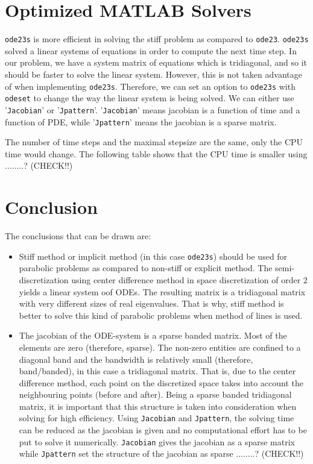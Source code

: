 \documentclass{article}
\begin{document}
\section{Optimized MATLAB Solvers}

\texttt{ode23s} is more efficient in solving the stiff problem as compared to \texttt{ode23}. \texttt{ode23s} solved a linear systems of equations in order to compute the next time step. In our problem, we have a system matrix of equations which is tridiagonal, and so it should be faster to solve the linear system. However, this is not taken advantage of when implementing \texttt{ode23s}. Therefore, we can set an option to \texttt{ode23s} with \texttt{odeset} to change the way the linear system is being solved. We can either use '\texttt{Jacobian}' or '\texttt{Jpattern}'. '\texttt{Jacobian}' means jacobian is a function of time and a function of PDE, while '\texttt{Jpattern}' means the jacobian is a sparse matrix.

The number of time steps and the maximal stepsize are the same, only the CPU time would change. The following table shows that the CPU time is smaller using ........? (CHECK!!)

\section{Conclusion}

The conclusions that can be drawn are:
\begin{itemize}
    \item Stiff method or implicit method (in this case \texttt{ode23s}) should be used for parabolic problems as compared to non-stiff or explicit method. The semi-discretization using center difference method in space discretization of order 2 yields a linear system oof ODEs. The resulting matrix is a tridiagonal matrix with very different sizes of real eigenvalues. That is why, stiff method is better to solve this kind of parabolic problems when method of lines is used.
    \item The jacobian of the ODE-system is a sparse banded matrix. Most of the elements are zero (therefore, sparse). The non-zero entities are confined to a diagonal band and the bandwidth is relatively small (therefore, band/banded), in this case a tridiagonal matrix. That is, due to the center difference method, each point on the discretized space takes into account the neighbouring points (before and after). Being a sparse banded tridiagonal matrix, it is important that this structure is taken into consideration when solving for high efficiency. Using \texttt{Jacobian} and \texttt{Jpattern}, the solving time can be reduced as the jacobian is given and no computational effort has to be put to solve it numerically. \texttt{Jacobian} gives the jacobian as a sparse matrix while \texttt{Jpattern} set the structure of the jacobian as sparse ........? (CHECK!!)
\end{itemize}
\end{document}
